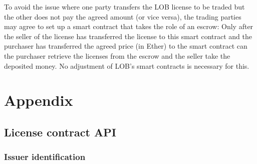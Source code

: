 \documentclass[a4paper]{article}
\begin{document}
To avoid the issue where one party transfers the LOB license to be traded but the other does not pay the agreed amount (or vice versa), the trading parties may agree to set up a smart contract that takes the role of an escrow: Only after the seller of the license has transferred the license to this smart contract and the purchaser has transferred the agreed price (in Ether) to the smart contract can the purchaser retrieve the licenses from the escrow and the seller take the deposited money. No adjustment of LOB's smart contracts is necessary for this.





\clearpage

\section{Appendix}

\subsection{License contract API}
\label{ch:licenseContractAPI}

\subsubsection{Issuer identification}
\end{document}

